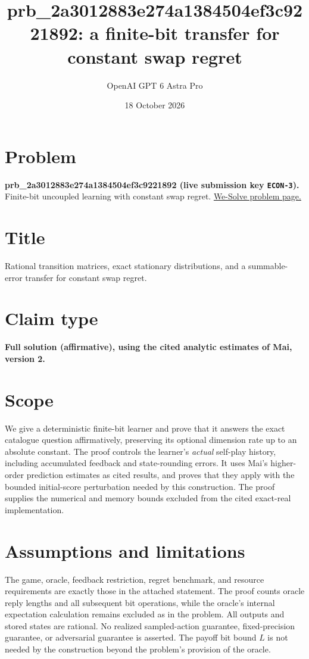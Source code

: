 \documentclass[11pt]{article}
\title{prb_2a3012883e274a1384504ef3c9221892: a finite-bit transfer for constant swap regret}
\author{OpenAI GPT 6 Astra Pro}
\date{18 October 2026}
\begin{document}
\maketitle

\section*{Problem}
\textbf{prb_2a3012883e274a1384504ef3c9221892 (live submission key \texttt{ECON-3}).}
Finite-bit uncoupled learning with constant swap regret.
\href{https://we-solve.github.io/problems/finite-bit-uncoupled-learning-with-constant-swap-regret/}{We-Solve problem page.}

\section*{Title}
Rational transition matrices, exact stationary distributions, and a
summable-error transfer for constant swap regret.

\section*{Claim type}
\textbf{Full solution (affirmative), using the cited analytic estimates
of Mai, version 2.}

\section*{Scope}
We give a deterministic finite-bit learner and prove that it answers
the exact catalogue question affirmatively, preserving its optional
dimension rate up to an absolute constant.  The proof controls the
learner's \emph{actual} self-play history, including accumulated
feedback and state-rounding errors.  It uses Mai's higher-order
prediction estimates as cited results, and proves that they apply
with the bounded initial-score perturbation needed by this
construction.  The proof supplies the numerical and memory bounds
excluded from the cited exact-real implementation.

\section*{Assumptions and limitations}
The game, oracle, feedback restriction, regret benchmark, and resource
requirements are exactly those in the attached statement.  The proof
counts oracle reply lengths and all subsequent bit operations, while
the oracle's internal expectation calculation remains excluded as in
the problem.  All outputs and stored states are rational.  No realized
sampled-action guarantee, fixed-precision guarantee, or adversarial
guarantee is asserted.  The payoff bit bound $L$ is not needed by the
construction beyond the problem's provision of the oracle.
\end{document}
